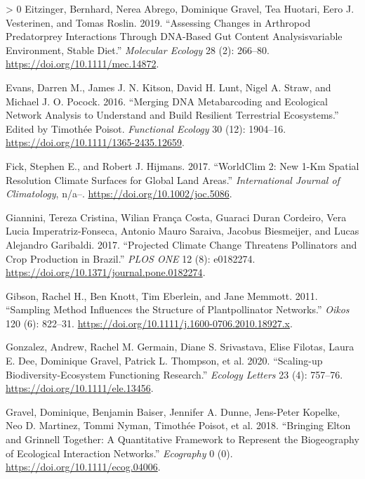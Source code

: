 \documentclass[11pt]{article}
\newlength{\cslhangindent}
\newenvironment{CSLReferences}[3] %
 {%
  \setlength{\parindent}{0pt}
  \ifodd #1 \everypar{\setlength{\hangindent}{\cslhangindent}}\ignorespaces\fi
  \ifnum #2 > 0
  \setlength{\parskip}{#2\baselineskip}
  \fi
 }%
 {}
\begin{document}
\begin{CSLReferences}{1}{0}
\leavevmode\hypertarget{ref-Eitzinger2019AssCha}{}%
Eitzinger, Bernhard, Nerea Abrego, Dominique Gravel, Tea Huotari, Eero
J. Vesterinen, and Tomas Roslin. 2019. {``Assessing Changes in Arthropod
Predatorprey Interactions Through DNA-Based Gut Content Analysisvariable
Environment, Stable Diet.''} \emph{Molecular Ecology} 28 (2): 266--80.
\url{https://doi.org/10.1111/mec.14872}.

\leavevmode\hypertarget{ref-Evans2016MerDna}{}%
Evans, Darren M., James J. N. Kitson, David H. Lunt, Nigel A. Straw, and
Michael J. O. Pocock. 2016. {``Merging DNA Metabarcoding and Ecological
Network Analysis to Understand and Build Resilient Terrestrial
Ecosystems.''} Edited by Timothée Poisot. \emph{Functional Ecology} 30
(12): 1904--16. \url{https://doi.org/10.1111/1365-2435.12659}.

\leavevmode\hypertarget{ref-Fick2017Wor2N}{}%
Fick, Stephen E., and Robert J. Hijmans. 2017. {``WorldClim 2: New 1-Km
Spatial Resolution Climate Surfaces for Global Land Areas.''}
\emph{International Journal of Climatology}, n/a--.
\url{https://doi.org/10.1002/joc.5086}.

\leavevmode\hypertarget{ref-Giannini2017ProCli}{}%
Giannini, Tereza Cristina, Wilian França Costa, Guaraci Duran Cordeiro,
Vera Lucia Imperatriz-Fonseca, Antonio Mauro Saraiva, Jacobus
Biesmeijer, and Lucas Alejandro Garibaldi. 2017. {``Projected Climate
Change Threatens Pollinators and Crop Production in Brazil.''}
\emph{PLOS ONE} 12 (8): e0182274.
\url{https://doi.org/10.1371/journal.pone.0182274}.

\leavevmode\hypertarget{ref-Gibson2011SamMet}{}%
Gibson, Rachel H., Ben Knott, Tim Eberlein, and Jane Memmott. 2011.
{``Sampling Method Influences the Structure of Plantpollinator
Networks.''} \emph{Oikos} 120 (6): 822--31.
\url{https://doi.org/10.1111/j.1600-0706.2010.18927.x}.

\leavevmode\hypertarget{ref-Gonzalez2020ScaBio}{}%
Gonzalez, Andrew, Rachel M. Germain, Diane S. Srivastava, Elise Filotas,
Laura E. Dee, Dominique Gravel, Patrick L. Thompson, et al. 2020.
{``Scaling-up Biodiversity-Ecosystem Functioning Research.''}
\emph{Ecology Letters} 23 (4): 757--76.
\url{https://doi.org/10.1111/ele.13456}.

\leavevmode\hypertarget{ref-Gravel2018BriElt}{}%
Gravel, Dominique, Benjamin Baiser, Jennifer A. Dunne, Jens-Peter
Kopelke, Neo D. Martinez, Tommi Nyman, Timothée Poisot, et al. 2018.
{``Bringing Elton and Grinnell Together: A Quantitative Framework to
Represent the Biogeography of Ecological Interaction Networks.''}
\emph{Ecography} 0 (0). \url{https://doi.org/10.1111/ecog.04006}.


\end{CSLReferences}
\end{document}
